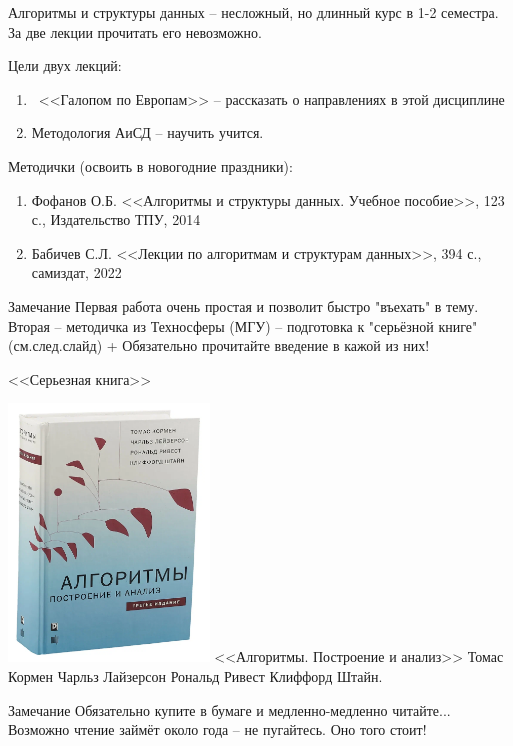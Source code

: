 \begin{frame}
\footnotesize
Алгоритмы и структуры данных -- несложный, но длинный курс в 1-2 семестра. 
За две лекции прочитать его невозможно. 

Цели двух лекций:
\begin{enumerate}
	\item ~<<Галопом по Европам>> -- рассказать о направлениях в этой дисциплине
	\item Методология АиСД -- научить учится.
\end{enumerate}

Методички (освоить в новогодние праздники):
\begin{enumerate}
	\item Фофанов О.Б. <<Алгоритмы и структуры данных. Учебное пособие>>, 123 с., Издательство ТПУ, 2014
	\item Бабичев С.Л. <<Лекции по алгоритмам и структурам данных>>, 394 с., самиздат, 2022
\end{enumerate}

\begin{block}{Замечание}
Первая работа очень простая и позволит быстро "въехать" в тему. 
Вторая -- методичка из Техносферы (МГУ) -- подготовка к "серьёзной книге" (см.след.слайд)
+ Обязательно прочитайте введение в кажой из них!
\end{block}

\end{frame}


\begin{frame}{<<Серьезная книга>>}


\includegraphics[width=0.4\textwidth]{./../pic/Kormen_3_edition_book_img.png}
<<Алгоритмы. Построение и анализ>>
Томас Кормен
Чарльз Лайзерсон
Рональд Ривест
Клиффорд Штайн.

\begin{block}{Замечание}
	Обязательно купите в бумаге 
	и медленно-медленно читайте...
	Возможно чтение займёт около года -- не пугайтесь. Оно того стоит!
\end{block}

\end{frame}



